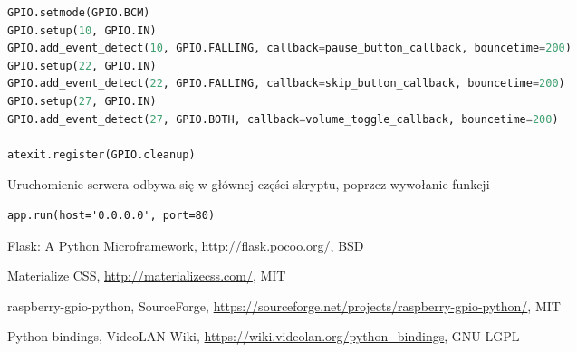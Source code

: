 \documentclass[10pt,a4paper]{article}
\begin{document}
\begin{lstlisting}[language=python, caption=Rejestracja funkcji obsługujących wciśnięcia]
GPIO.setmode(GPIO.BCM)
GPIO.setup(10, GPIO.IN)
GPIO.add_event_detect(10, GPIO.FALLING, callback=pause_button_callback, bouncetime=200)
GPIO.setup(22, GPIO.IN)
GPIO.add_event_detect(22, GPIO.FALLING, callback=skip_button_callback, bouncetime=200)
GPIO.setup(27, GPIO.IN)
GPIO.add_event_detect(27, GPIO.BOTH, callback=volume_toggle_callback, bouncetime=200)

atexit.register(GPIO.cleanup)
\end{lstlisting}

Uruchomienie serwera odbywa się w głównej części skryptu, poprzez wywołanie funkcji
\begin{lstlisting}
app.run(host='0.0.0.0', port=80)
\end{lstlisting}

\begin{thebibliography}{9}

	Flask: A Python Microframework,
		\url{http://flask.pocoo.org/},
		BSD

	Materialize CSS,
		\url{http://materializecss.com/},
		MIT

	raspberry-gpio-python,
		SourceForge,
		\url{https://sourceforge.net/projects/raspberry-gpio-python/},
		MIT

	Python bindings,
		VideoLAN Wiki,
		\url{https://wiki.videolan.org/python_bindings},
		GNU LGPL

\end{thebibliography}
\end{document}
